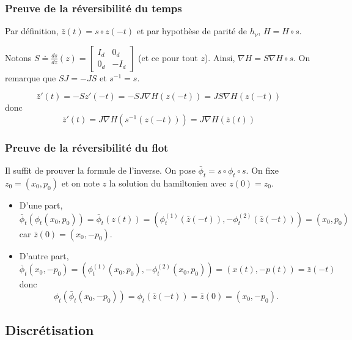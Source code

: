 \documentclass[10pt]{beamer}
\begin{document}
\begin{frame}
  \frametitle{Preuve de la réversibilité du temps}
		Par définition, $\bar{z}(t) = s \circ z (-t)$ et par hypothèse de parité de $h_\nu$, $H = H \circ s$.

		Notons $S \doteq \frac{ds}{dz}(z) = \begin{bmatrix} I_d & 0_d \\ 0_d & -I_d \end{bmatrix}$ (et ce pour tout $z$). Ainsi, $\nabla H = S \nabla H \circ s$. On remarque que $SJ = -JS$ et $s^{-1} = s$.

		$$\bar z'(t) = -Sz'(-t) = -SJ\nabla H(z(-t)) = JS \nabla H(z(-t))$$
		donc
		$$\bar z'(t) = J \nabla H (s^{-1}(z(-t))) = J \nabla H(\bar z(t))$$
                \null\hfill\qedsymbol
\end{frame}

\begin{frame}
  \frametitle{Preuve de la réversibilité du flot}
		Il suffit de prouver la formule de l'inverse. On pose $\bar \phi_t = s \circ \phi_t \circ s$. On fixe $z_0 = (x_0,p_0)$ et on note $z$ la solution du hamiltonien avec $z(0) = z_0$.
		\begin{itemize}
			\item D'une part,
			$$
			\bar \phi_t(\phi_t(x_0,p_0)) = \bar \phi_t(z(t)) = (\phi_t^{(1)}(\bar z(-t)), - \phi_t^{(2)}(\bar z(-t))) = (x_0, p_0)
			$$
			car $\bar z(0) = (x_0,-p_0)$.

			\item D'autre part,
			$$
			\bar \phi_t(x_0,-p_0) = (\phi_t^{(1)}(x_0, p_0), - \phi_t^{(2)}(x_0, p_0)) = (x(t),-p(t)) = \bar z(-t)
			$$
			donc
			$$
			\phi_t (\bar \phi_t(x_0,-p_0)) = \phi_t(\bar z(-t)) = \bar{z}(0) = (x_0,-p_0).
			$$
                      \end{itemize}
                      \null\hfill\qedsymbol
\end{frame}
 
\subsection{Discrétisation}
\end{document}
